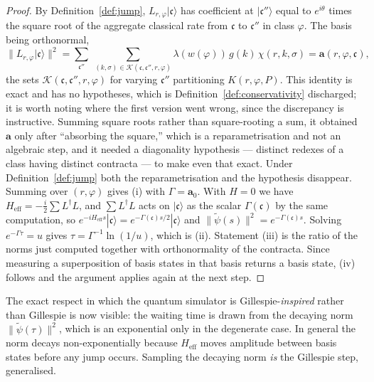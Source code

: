 \documentclass[11pt,a4paper]{article}
\theoremstyle{plain}
\theoremstyle{definition}
\theoremstyle{remark}
\newcommand{\prop}{\mathbf{a}}
\newcommand{\wmap}{w}
\newcommand{\gfac}{g}
\newcommand{\Lop}{L}
\newcommand{\Heff}{H_{\mathrm{eff}}}
\begin{document}
\begin{proof}
By Definition~\ref{def:jump}, $\Lop_{r,\varphi}|\mathfrak{c}\rangle$ has coefficient at
$|\mathfrak{c}''\rangle$ equal to $e^{i\theta}$ times the square root of the aggregate classical rate
from $\mathfrak{c}$ to $\mathfrak{c}''$ in class $\varphi$. The basis being orthonormal,
\[
\big\|\Lop_{r,\varphi}|\mathfrak{c}\rangle\big\|^2
= \sum_{\mathfrak{c}''} \;\sum_{(k,\sigma) \in \mathcal{K}(\mathfrak{c},\mathfrak{c}'',r,\varphi)}
\lambda(\wmap(\varphi))\,\gfac(k)\,\chi(r,k,\sigma)
= \prop(r,\varphi,\mathfrak{c}),
\]
the sets $\mathcal{K}(\mathfrak{c},\mathfrak{c}'',r,\varphi)$ for varying $\mathfrak{c}''$
partitioning $K(r,\varphi,P)$. This identity is exact and has no hypotheses, which is
Definition~\ref{def:conservativity} discharged; it is worth noting where the first version went
wrong, since the discrepancy is instructive. Summing square roots rather than square-rooting a sum,
it obtained $\prop$ only after ``absorbing the square,'' which is a reparametrisation and not an
algebraic step, and it needed a diagonality hypothesis --- distinct redexes of a class having
distinct contracta --- to make even that exact. Under Definition~\ref{def:jump} both the
reparametrisation and the hypothesis disappear. Summing over $(r,\varphi)$ gives (i) with
$\Gamma = \prop_0$. With $H = 0$ we have $\Heff = -\tfrac{i}{2}\sum \Lop^\dagger \Lop$, and
$\sum\Lop^\dagger\Lop$ acts on $|\mathfrak{c}\rangle$ as the scalar $\Gamma(\mathfrak{c})$ by the same
computation, so $e^{-i\Heff s}|\mathfrak{c}\rangle = e^{-\Gamma(\mathfrak{c})s/2}|\mathfrak{c}\rangle$
and $\|\tilde\psi(s)\|^2 = e^{-\Gamma(\mathfrak{c})s}$. Solving $e^{-\Gamma\tau} = u$ gives
$\tau = \Gamma^{-1}\ln(1/u)$, which is (ii). Statement (iii) is the ratio of the norms just computed
together with orthonormality of the contracta. Since measuring a superposition of basis states in
that basis returns a basis state, (iv) follows and the argument applies again at the next step.
\end{proof}

The exact respect in which the quantum simulator is Gillespie-\emph{inspired} rather than Gillespie
is now visible: the waiting time is drawn from the decaying norm $\|\tilde\psi(\tau)\|^2$, which is
an exponential only in the degenerate case. In general the norm decays non-exponentially because
$\Heff$ moves amplitude between basis states before any jump occurs. Sampling the decaying norm
\emph{is} the Gillespie step, generalised.
\end{document}
